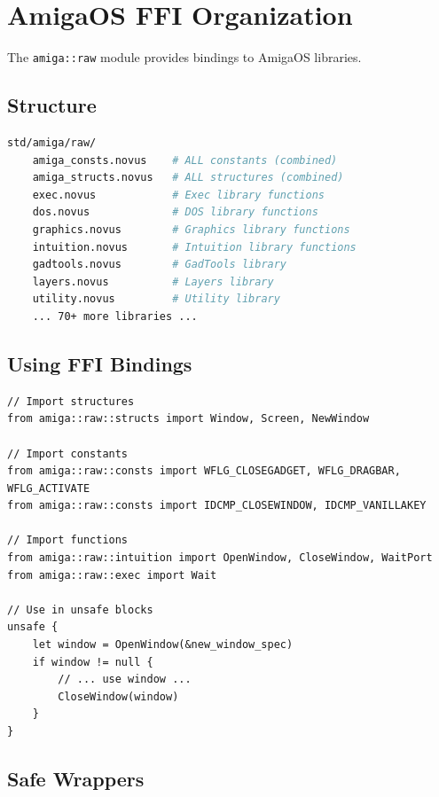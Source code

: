 \section{AmigaOS FFI Organization}
\label{sec:stdlib-ffi}

The \texttt{amiga::raw} module provides bindings to AmigaOS libraries.

\subsection{Structure}

\begin{lstlisting}[language=bash]
std/amiga/raw/
    amiga_consts.novus    # ALL constants (combined)
    amiga_structs.novus   # ALL structures (combined)
    exec.novus            # Exec library functions
    dos.novus             # DOS library functions
    graphics.novus        # Graphics library functions
    intuition.novus       # Intuition library functions
    gadtools.novus        # GadTools library
    layers.novus          # Layers library
    utility.novus         # Utility library
    ... 70+ more libraries ...
\end{lstlisting}

\subsection{Using FFI Bindings}

\begin{lstlisting}
// Import structures
from amiga::raw::structs import Window, Screen, NewWindow

// Import constants
from amiga::raw::consts import WFLG_CLOSEGADGET, WFLG_DRAGBAR, WFLG_ACTIVATE
from amiga::raw::consts import IDCMP_CLOSEWINDOW, IDCMP_VANILLAKEY

// Import functions
from amiga::raw::intuition import OpenWindow, CloseWindow, WaitPort
from amiga::raw::exec import Wait

// Use in unsafe blocks
unsafe {
    let window = OpenWindow(&new_window_spec)
    if window != null {
        // ... use window ...
        CloseWindow(window)
    }
}
\end{lstlisting}

\subsection{Safe Wrappers}

